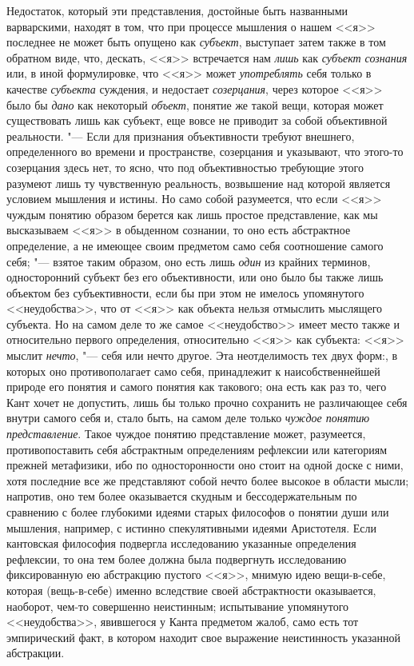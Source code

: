 Недостаток, который эти представления, достойные быть
названными варварскими, находят в том, что при процессе мышления о нашем
<<я>> последнее не может быть опущено как
{\em субъект}, выступает
затем также в том обратном виде, что, дескать, <<я>> встречается нам
{\em лишь} как
{\em субъект сознания}
или, в иной формулировке, что <<я>> может
{\em употреблять} себя
только в качестве {\em субъекта}
суждения, и недостает
{\em созерцания}, через
которое <<я>> было бы {\em дано}
как некоторый
{\em объект}, понятие же
такой вещи, которая может существовать лишь как субъект, еще вовсе не
приводит за собой объективной
реальности\label{bkm:bm98}.
"--- Если для признания объективности требуют внешнего,
определенного во времени и пространстве, созерцания и указывают, что
этого-то созерцания здесь нет, то ясно, что под объективностью требующие
этого разумеют лишь ту чувственную реальность, возвышение над которой
является условием мышления и истины. Но само собой разумеется, что если <<я>>
чуждым понятию образом берется как лишь простое представление, как мы
высказываем <<я>> в обыденном сознании, то оно есть абстрактное определение,
а не имеющее своим предметом само себя соотношение самого
себя; "--- взятое таким образом, оно есть лишь
{\em один} из крайних
терминов, односторонний субъект без его объективности, или оно было бы
также лишь объектом без субъективности, если бы при этом не имелось
упомянутого <<неудобства>>, что от <<я>> как объекта нельзя отмыслить мыслящего
субъекта. Но на самом деле то же самое <<неудобство>> имеет место также и
относительно первого определения, относительно <<я>> как субъекта: <<я>> мыслит
{\em нечто}, "--- себя или
нечто другое. Эта неотделимость тех двух форм:, в которых оно
противополагает само себя, принадлежит к наисобственнейшей природе его
понятия и самого понятия как такового; она есть как раз то, чего Кант хочет
не допустить, лишь бы только прочно сохранить не различающее
себя внутри самого себя и, стало быть, на самом деле только
{\em чуждое понятию представление}.
Такое чуждое понятию представление может, разумеется,
противопоставить себя абстрактным определениям рефлексии или категориям
прежней метафизики, ибо по односторонности оно стоит на одной доске с ними,
хотя последние все же представляют собой нечто более высокое в области
мысли; напротив, оно тем более оказывается скудным и бессодержательным по
сравнению с более глубокими идеями старых философов о понятии души или
мышления, например, с истинно спекулятивными идеями Аристотеля. Если
кантовская философия подвергла исследованию указанные определения
рефлексии, то она тем более должна была подвергнуть исследованию
фиксированную ею абстракцию пустого <<я>>, мнимую идею вещи-в-себе, которая
(вещь-в-себе) именно вследствие своей абстрактности оказывается, наоборот,
чем-то совершенно неистинным; испытывание упомянутого <<неудобства>>,
явившегося у Канта предметом жалоб, само есть тот эмпирический факт, в
котором находит свое выражение неистинность указанной абстракции.

